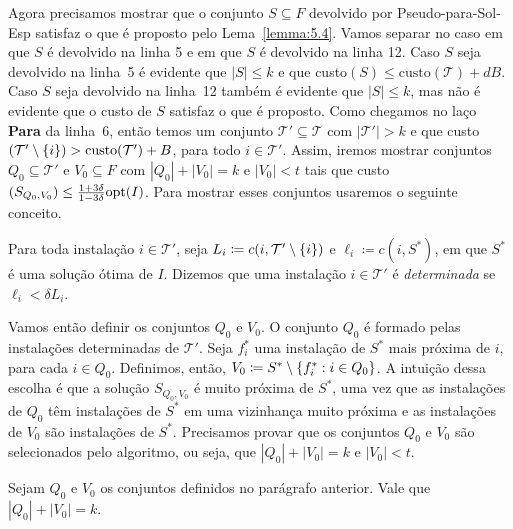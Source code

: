 Agora precisamos mostrar que o conjunto $S \subseteq F$ devolvido por {\sc Pseudo-para-Sol-Esp} satisfaz o que é proposto pelo Lema~\ref{lemma:5.4}. Vamos separar no caso em que $S$ é devolvido na linha 5 e em que $S$ é devolvido na linha 12. Caso $S$ seja devolvido na linha~5 é evidente que $|S| \leq k$ e que custo$(S) \leq \text{custo}(\mathcal{T}) + dB$. Caso $S$ seja devolvido na linha~12 também é evidente que $|S| \leq k$, mas não é evidente que o custo de $S$ satisfaz o que é proposto. Como chegamos no laço {\bf Para} da linha~6, então temos um conjunto $\mathcal{T}' \subseteq \mathcal{T}$ com $|\mathcal{T}'| > k$ e que custo$(\mathcal{T}' \setminus \{i\}) > \text{custo}(\mathcal{T}') + B$, para todo $i \in \mathcal{T}'$.  Assim, iremos mostrar conjuntos $Q_0 \subseteq \mathcal{T}'$ e $V_0 \subseteq F$ com $|Q_0| + |V_0| = k$ e $|V_0| < t$ tais que custo$(S_{Q_0,V_0}) \leq \frac{1+3\delta}{1-3\delta}\mathrm{opt}(I)$.
Para mostrar esses conjuntos usaremos o seguinte conceito.
\begin{definition}
    Para toda instalação $i \in \mathcal{T}'$, seja $L_i \coloneqq c(i,\mathcal{T}' \setminus \{i\})$ e $\ell_i \coloneqq c(i,S^*)$, em que $S^*$ é uma solução ótima de $I$. Dizemos que uma instalação $i \in \mathcal{T}'$ é \emph{determinada} se $\ell_i < \delta L_i$.
\end{definition}
Vamos então definir os conjuntos $Q_0$ e $V_0$. O conjunto $Q_0$ é formado pelas instalações determinadas de $\mathcal{T}'$. Seja $f_i^*$ uma instalação de $S^*$ mais próxima de $i$, para cada $i \in Q_0$. Definimos, então, $V_0 \coloneqq S^* \setminus \{f_i^* : i\in Q_0\}$. A intuição dessa escolha é que a solução $S_{Q_0,V_0}$ é muito próxima de $S^*$, uma vez que as instalações de $Q_0$ têm instalações de $S^*$ em uma vizinhança muito próxima e as instalações de $V_0$ são instalações de $S^*$. Precisamos provar que os conjuntos $Q_0$ e $V_0$ são selecionados pelo algoritmo, ou seja, que $|Q_0| + |V_0| = k$ e $|V_0| < t$.

\begin{lemma}\label{lemma:5.7}
    Sejam $Q_0$ e $V_0$ os conjuntos definidos no parágrafo anterior. Vale que ${|Q_0| + |V_0| = k}$.
\end{lemma}

